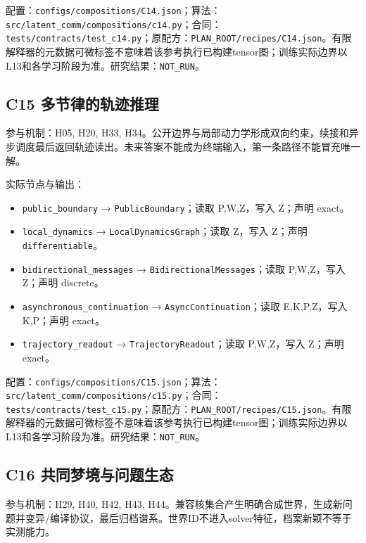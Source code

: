 \documentclass[
  10pt,
]{article}
\begin{document}
配置：{\small\nolinkurl{configs/compositions/C14.json}}；算法：{\small\nolinkurl{src/latent_comm/compositions/c14.py}}；合同：{\small\nolinkurl{tests/contracts/test_c14.py}}；原配方：{\small\nolinkurl{PLAN_ROOT/recipes/C14.json}}。有限解释器的元数据可微标签不意味着该参考执行已构建tensor图；训练实际边界以L13和各学习阶段为准。研究结果：\nolinkurl{NOT_RUN}。

\subsection{C15
多节律的轨迹推理}\label{c15-ux591aux8282ux5f8bux7684ux8f68ux8ff9ux63a8ux7406}

参与机制：H05, H20, H33,
H34。公开边界与局部动力学形成双向约束，续接和异步调度最后返回轨迹读出。未来答案不能成为终端输入，第一条路径不能冒充唯一解。

实际节点与输出：

\begin{itemize}
\item
  \nolinkurl{public_boundary} → \nolinkurl{PublicBoundary}；读取
  P,W,Z，写入 Z；声明 exact。
\item
  \nolinkurl{local_dynamics} → \nolinkurl{LocalDynamicsGraph}；读取
  Z，写入 Z；声明 \nolinkurl{differentiable}。
\item
  \nolinkurl{bidirectional_messages} →
  \nolinkurl{BidirectionalMessages}；读取 P,W,Z，写入 Z；声明 discrete。
\item
  \nolinkurl{asynchronous_continuation} →
  \nolinkurl{AsyncContinuation}；读取 E,K,P,Z，写入 K,P；声明 exact。
\item
  \nolinkurl{trajectory_readout} → \nolinkurl{TrajectoryReadout}；读取
  P,W,Z，写入 Z；声明 exact。
\end{itemize}

配置：{\small\nolinkurl{configs/compositions/C15.json}}；算法：{\small\nolinkurl{src/latent_comm/compositions/c15.py}}；合同：{\small\nolinkurl{tests/contracts/test_c15.py}}；原配方：{\small\nolinkurl{PLAN_ROOT/recipes/C15.json}}。有限解释器的元数据可微标签不意味着该参考执行已构建tensor图；训练实际边界以L13和各学习阶段为准。研究结果：\nolinkurl{NOT_RUN}。

\subsection{C16
共同梦境与问题生态}\label{c16-ux5171ux540cux68a6ux5883ux4e0eux95eeux9898ux751fux6001}

参与机制：H29, H40, H42, H43,
H44。兼容核集合产生明确合成世界，生成新问题并变异/编译协议，最后归档谱系。世界ID不进入solver特征，档案新颖不等于实测能力。
\end{document}
